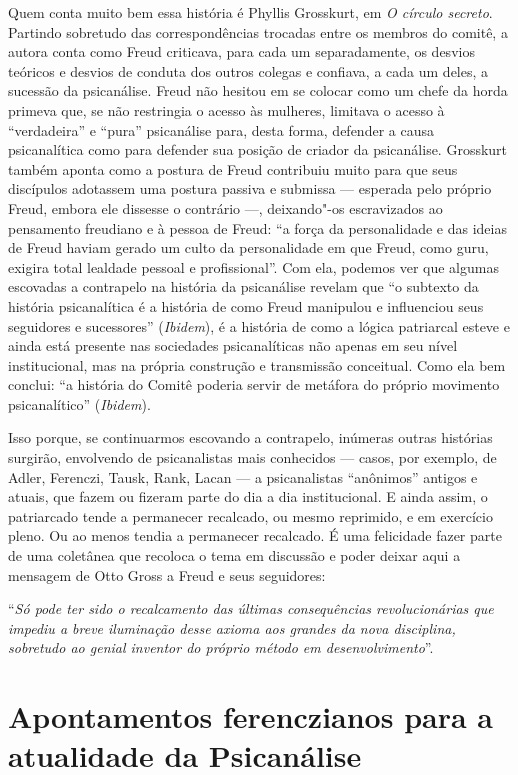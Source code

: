 Quem conta muito bem essa história é Phyllis Grosskurt, em \emph{O
círculo secreto}. Partindo sobretudo das correspondências trocadas
entre os membros do comitê, a autora conta como Freud criticava, para
cada um separadamente, os desvios teóricos e desvios de conduta dos
outros colegas e confiava, a cada um deles, a sucessão da psicanálise.
Freud não hesitou em se colocar como um chefe da horda primeva que, se
não restringia o acesso às mulheres, limitava o acesso à ``verdadeira''
e ``pura'' psicanálise para, desta forma, defender a causa psicanalítica
como para defender sua posição de criador da psicanálise. Grosskurt
também aponta como a postura de Freud contribuiu muito para que seus
discípulos adotassem uma postura passiva e submissa --- esperada pelo
próprio Freud, embora ele dissesse o contrário ---, deixando"-os
escravizados ao pensamento freudiano e à pessoa de Freud: ``a força da
personalidade e das ideias de Freud haviam gerado um culto da
personalidade em que Freud, como guru, exigira total lealdade pessoal e
profissional''. Com ela, podemos ver que algumas escovadas a contrapelo
na história da psicanálise revelam que ``o subtexto da história
psicanalítica é a história de como Freud manipulou e influenciou seus
seguidores e sucessores'' (\emph{Ibidem}), é a história de como a lógica
patriarcal esteve e ainda está presente nas sociedades psicanalíticas
não apenas em seu nível institucional, mas na própria construção e
transmissão conceitual. Como ela bem conclui: ``a história do Comitê
poderia servir de metáfora do próprio movimento psicanalítico''
(\emph{Ibidem}).

Isso porque, se continuarmos escovando a contrapelo, inúmeras outras
histórias surgirão, envolvendo de psicanalistas mais conhecidos ---
casos, por exemplo, de Adler, Ferenczi, Tausk, Rank, Lacan --- a
psicanalistas ``anônimos'' antigos e atuais, que fazem ou fizeram parte
do dia a dia institucional. E ainda assim, o patriarcado tende a
permanecer recalcado, ou mesmo reprimido, e em exercício pleno. Ou ao
menos tendia a permanecer recalcado. É uma felicidade fazer parte de uma
coletânea que recoloca o tema em discussão e poder deixar aqui a
mensagem de Otto Gross a Freud e seus seguidores:

``\emph{Só pode ter sido o recalcamento das últimas consequências
revolucionárias que impediu a breve iluminação desse axioma aos grandes
da nova disciplina, sobretudo ao genial inventor do próprio método em
desenvolvimento}''.

\chapter*{Apontamentos ferenczianos para a atualidade da Psicanálise}

